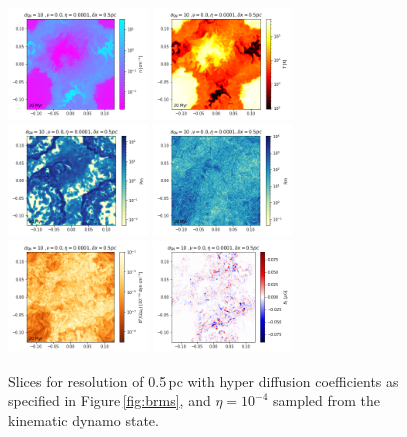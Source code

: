 \documentclass[preprint2]{aastex63}
\begin{document}
\begin{figure}
\centering
\includegraphics[trim=0.0cm 0.00cm 0.0cm 0.0cm,clip=true,width=0.33\textwidth]{csc_figs/rho05pcPm0e-4_02.png}
\includegraphics[trim=0.0cm 0.00cm 0.0cm 0.0cm,clip=true,width=0.33\textwidth]{csc_figs/tt05pcPm0e-4_02.png}
\includegraphics[trim=0.0cm 0.00cm 0.0cm 0.0cm,clip=true,width=0.33\textwidth]{csc_figs/Pm05pcPm0e-4_02.png}
\includegraphics[trim=0.0cm 0.00cm 0.0cm 0.0cm,clip=true,width=0.33\textwidth]{csc_figs/Rm05pcPm0e-4_02.png}
\includegraphics[trim=0.0cm 0.00cm 0.0cm 0.0cm,clip=true,width=0.33\textwidth]{csc_figs/pb05pcPm0e-4_02.png}
\includegraphics[trim=0.0cm 0.00cm 0.0cm 0.0cm,clip=true,width=0.33\textwidth]{csc_figs/bb105pcPm0e-4_02.png}
\caption{
Slices for resolution of 0.5\,pc with hyper diffusion coefficients as 
specified in Figure\,\ref{fig:brms}, and $\eta=10^{-4}$ sampled from the 
kinematic dynamo state.
\label{fig:05pcUB}
}
\end{figure}
\end{document}
